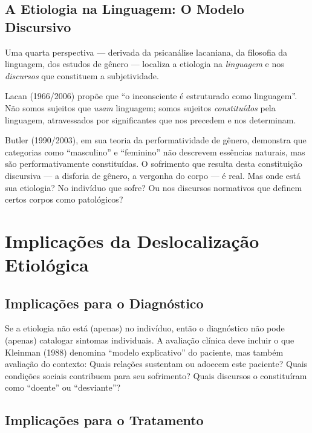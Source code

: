 \subsection{A Etiologia na Linguagem: O Modelo Discursivo}

Uma quarta perspectiva --- derivada da psicanálise lacaniana, da filosofia da linguagem, dos estudos de gênero --- localiza a etiologia na \textit{linguagem} e nos \textit{discursos} que constituem a subjetividade.

Lacan (1966/2006) propõe que \enquote{o inconsciente é estruturado como linguagem}. Não somos sujeitos que \textit{usam} linguagem; somos sujeitos \textit{constituídos} pela linguagem, atravessados por significantes que nos precedem e nos determinam.

Butler (1990/2003), em sua teoria da performatividade de gênero, demonstra que categorias como \enquote{masculino} e \enquote{feminino} não descrevem essências naturais, mas são performativamente constituídas. O sofrimento que resulta desta constituição discursiva --- a disforia de gênero, a vergonha do corpo --- é real. Mas onde está sua etiologia? No indivíduo que sofre? Ou nos discursos normativos que definem certos corpos como patológicos?

\section{Implicações da Deslocalização Etiológica}
\label{sec:implicacoes}

\subsection{Implicações para o Diagnóstico}

Se a etiologia não está (apenas) no indivíduo, então o diagnóstico não pode (apenas) catalogar sintomas individuais. A avaliação clínica deve incluir o que Kleinman (1988) denomina \enquote{modelo explicativo} do paciente, mas também avaliação do contexto: Quais relações sustentam ou adoecem este paciente? Quais condições sociais contribuem para seu sofrimento? Quais discursos o constituíram como \enquote{doente} ou \enquote{desviante}?

\subsection{Implicações para o Tratamento}

